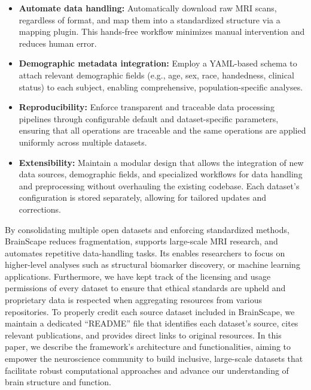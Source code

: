 \begin{itemize}
    
    \item \textbf{Automate data handling:} 
    Automatically download raw MRI scans, regardless of format, and map them into a standardized structure via a mapping plugin. 
    This hands-free workflow minimizes manual intervention and reduces human error.

    \item \textbf{Demographic metadata integration:}
    Employ a YAML-based schema to attach relevant demographic fields (e.g., age, sex, race, handedness, clinical status) to each subject, 
    enabling comprehensive, population-specific analyses.

    \item \textbf{Reproducibility:}
    Enforce transparent and traceable data processing pipelines through configurable default and dataset-specific parameters, ensuring 
    that all operations are traceable and the same operations are applied uniformly across multiple datasets.

    \item \textbf{Extensibility:}
    Maintain a modular design that allows the integration of new data sources, demographic fields, and specialized workflows for data handling and preprocessing 
    without overhauling the existing codebase. 
    Each dataset's configuration is stored separately, allowing for tailored updates and corrections.

\end{itemize}


By consolidating multiple open datasets and enforcing standardized methods, BrainScape reduces fragmentation, 
supports large-scale MRI research, and automates repetitive data-handling tasks. 
Its enables researchers to focus on higher-level analyses such as structural biomarker discovery, 
or machine learning applications.
Furthermore, we have kept track of the licensing and usage permissions of every dataset to ensure that ethical 
standards are upheld and proprietary data is respected when aggregating resources from various repositories.
To properly credit each source dataset included in BrainScape, we maintain a dedicated ``README'' file 
that identifies each dataset's source, cites relevant publications, and provides direct links to original resources.
In this paper, we describe the framework's architecture and functionalities, 
aiming to empower the neuroscience community to build inclusive, 
large-scale datasets that facilitate robust computational approaches 
and advance our understanding of brain structure and function.
